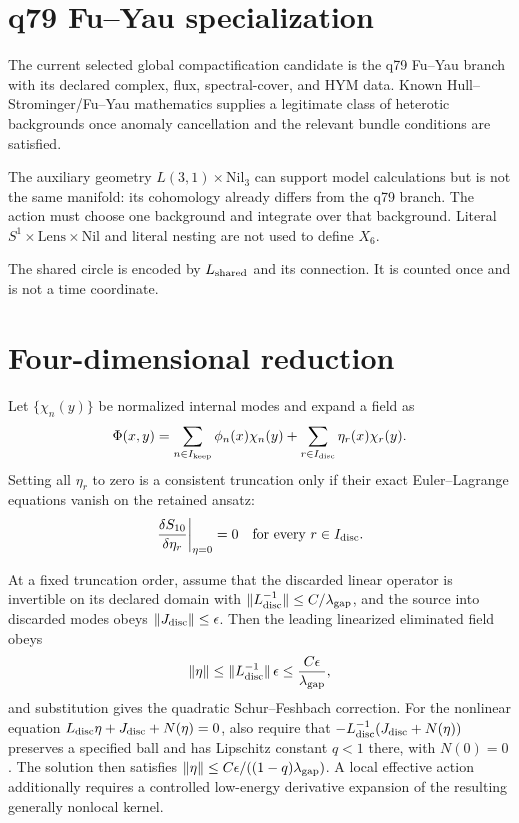 \documentclass[11pt]{article}
\begin{document}
\section{q79 Fu--Yau specialization}

The current selected global compactification candidate is the q79 Fu--Yau
branch with its declared complex, flux, spectral-cover, and HYM data.  Known
Hull--Strominger/Fu--Yau mathematics supplies a legitimate class of heterotic
backgrounds once anomaly cancellation and the relevant bundle conditions are
satisfied.

The auxiliary geometry $L(3,1)\times\mathrm{Nil}_3$ can support model
calculations but is not the same manifold: its cohomology already differs from
the q79 branch.  The action must choose one background and integrate over that
background.  Literal $S^1\times\mathrm{Lens}\times\mathrm{Nil}$ and literal
nesting are not used to define $X_6$.

The shared circle is encoded by $L_{\rm shared}$ and its connection.  It is
counted once and is not a time coordinate.

\section{Four-dimensional reduction}

Let $\{\chi_n(y)\}$ be normalized internal modes and expand a field as
\[
 \Phi(x,y)=\sum_{n\in I_{\rm keep}}\phi_n(x)\chi_n(y)
 +\sum_{r\in I_{\rm disc}}\eta_r(x)\chi_r(y).
\]
Setting all $\eta_r$ to zero is a consistent truncation only if their exact
Euler--Lagrange equations vanish on the retained ansatz:
\[
 \left.\frac{\delta S_{10}}{\delta\eta_r}\right|_{\eta=0}=0
 \quad\text{for every }r\in I_{\rm disc}.
\]

\begin{theorem}
At a fixed truncation order, assume that the discarded linear operator is
invertible on its declared domain with
$\|L_{\rm disc}^{-1}\|\le C/\lambda_{\rm gap}$, and the source into
discarded modes obeys $\|J_{\rm disc}\|\le\epsilon$. Then the leading
linearized eliminated field obeys
\[
 \|\eta\|\le
 \|L_{\rm disc}^{-1}\|\,\epsilon
 \le \frac{C\epsilon}{\lambda_{\rm gap}},
\]
and substitution gives the quadratic Schur--Feshbach correction. For the
nonlinear equation $L_{\rm disc}\eta+J_{\rm disc}+N(\eta)=0$, also
require that $-L_{\rm disc}^{-1}(J_{\rm disc}+N(\eta))$ preserves a
specified ball and has Lipschitz constant $q<1$ there, with $N(0)=0$.
The solution then satisfies
$\|\eta\|\le C\epsilon/((1-q)\lambda_{\rm gap})$.
A local effective action additionally requires a controlled low-energy
derivative expansion of the resulting generally nonlocal kernel.
\end{theorem}
\end{document}
